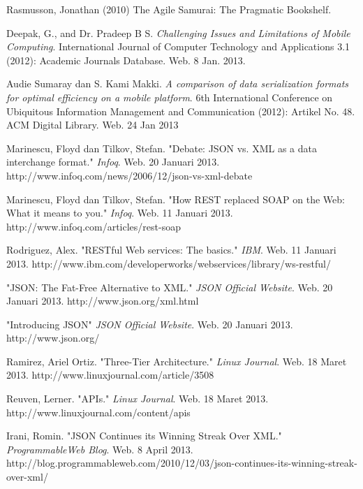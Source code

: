 \documentclass{llncs}
\begin{document}
\begin{thebibliography}{1}

Rasmusson, Jonathan (2010) The Agile Samurai: The Pragmatic Bookshelf.

Deepak, G., and Dr. Pradeep B S. \emph{Challenging Issues and Limitations of Mobile Computing}. International Journal of Computer Technology and Applications 3.1 (2012): Academic Journals Database. Web. 8 Jan. 2013.

Audie Sumaray dan S. Kami Makki. \emph{A comparison of data serialization formats for optimal efficiency on a mobile platform}. 6th International Conference on Ubiquitous Information Management and Communication (2012): Artikel No. 48. ACM Digital Library. Web. 24 Jan 2013

Marinescu, Floyd dan Tilkov, Stefan. "Debate: JSON vs. XML as a data interchange format." \emph{Infoq}. Web. 20 Januari 2013. http://www.infoq.com/news/2006/12/json-vs-xml-debate

Marinescu, Floyd dan Tilkov, Stefan. "How REST replaced SOAP on the Web: What it means to you." \emph{Infoq}. Web. 11 Januari 2013. http://www.infoq.com/articles/rest-soap

Rodriguez, Alex. "RESTful Web services: The basics." \emph{IBM}. Web. 11 Januari 2013. http://www.ibm.com/developerworks/webservices/library/ws-restful/

"JSON: The Fat-Free Alternative to XML." \emph{JSON Official Website}. Web. 20 Januari 2013. http://www.json.org/xml.html

"Introducing JSON" \emph{JSON Official Website}. Web. 20 Januari 2013. http://www.json.org/
  
Ramirez, Ariel Ortiz. "Three-Tier Architecture." \emph{Linux Journal}. Web. 18 Maret 2013. http://www.linuxjournal.com/article/3508

Reuven, Lerner. "APIs." \emph{Linux Journal}. Web. 18 Maret 2013. http://www.linuxjournal.com/content/apis

Irani, Romin. "JSON Continues its Winning Streak Over XML." \emph{ProgrammableWeb Blog}. Web. 8 April 2013. http://blog.programmableweb.com/2010/12/03/json-continues-its-winning-streak-over-xml/


\end{thebibliography}
\end{document}
